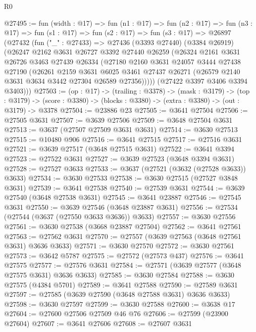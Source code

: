 \begin{lexlean}{R0}
\begin{coremodule}
@27495 := fun (width : @17) =>
  fun (n1 : @17) =>
  fun (n2 : @17) =>
  fun (n3 : @17) =>
  fun (s1 : @17) =>
  fun (s2 : @17) =>
  fun (s3 : @17) =>
  @26897
    (@27432
      (fun ("_" : @27433) =>
      @27436
        (@3393 @27440)
        (@3384 @26919)
        (@26247
          @2162
          @3631
          @26727
          @3392
          @27440
          @26259
          (@26324
            @2161
            @3631
            @26726
            @3463
            @27439
            @26334
            (@27180
              @2160
              @3631
              @24057
              @3444
              @27438
              @27190
              (@26261
                @2159
                @3631
                @6025
                @3461
                @27437
                @26271
                (@26579 @2140 @3631 @3634 @3442 @27304 @26589 @27356)))))
        (@27422 @3397 @3406 @3394 @3403)))
@27503 := (op : @17) ->
  (trailing : @3378) ->
  (mask : @3179) ->
  (top : @3179) -> (score : @3380) -> (blocks : @3380) -> (extra : @3380) -> (out : @3179) -> @3378
@27504 := @23886 @23
@27505 := @3641 @27504
@27506 := @27505 @3631
@27507 := @3639 @27506
@27509 := @3648 @27504 @3631
@27513 := @3637 (@27507 @27509 @3631 @3631)
@27514 := @3630 @27513
@27515 := @10480 @906
@27516 := @3641 @27515
@27517 := @27516 @3631
@27521 := @3639 @27517 (@3648 @27515 @3631)
@27522 := @3641 @3394
@27523 := @27522 @3631
@27527 := @3639 @27523 (@3648 @3394 @3631)
@27528 := @27527 @3633
@27533 := @3637 (@27521 (@3632 (@27528 @3633)) @3633)
@27534 := @3630 @27533
@27538 := @3630 @27515 (@27527 @3848 @3631)
@27539 := @3641 @27538
@27540 := @27539 @3631
@27544 := @3639 @27540 (@3648 @27538 @3631)
@27545 := @3641 @23887
@27546 := @27545 @3631
@27550 := @3639 @27546 (@3648 @23887 @3631)
@27556 := @27534 (@27544 (@3637 (@27550 @3633 @3636)) @3633)
@27557 := @3630 @27556
@27561 := @3630 @27538 (@3668 @23887 @27504)
@27562 := @3641 @27561
@27563 := @27562 @3631
@27570 := @27557 (@3639 @27563 (@3648 @27561 @3631) @3636 @3633)
@27571 := @3630 @27570
@27572 := @3630 @27561
@27573 := @3642 @5787
@27575 := @27572 (@27573 @437)
@27576 := @3641 @27575
@27577 := @27576 @3631
@27584 := @27571 (@3639 @27577 (@3648 @27575 @3631) @3636 @3633)
@27585 := @3630 @27584
@27588 := @3630 @27575 (@4384 @5701)
@27589 := @3641 @27588
@27590 := @27589 @3631
@27597 := @27585 (@3639 @27590 (@3648 @27588 @3631) @3636 @3633)
@27598 := @3630 @27597
@27599 := @3630 @27588
@27600 := @3638 @17
@27604 := @27600 @27506 @27509 @46 @76
@27606 := @27599 (@23900 @27604)
@27607 := @3641 @27606
@27608 := @27607 @3631

\end{coremodule}
\end{lexlean}
